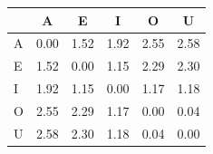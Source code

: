 \begin{tabular}{lccccc}
\toprule
\rowcolor{col01}
 & A & E & I & O & U \\
\midrule
A & 0.00 & 1.52 & 1.92 & 2.55 & 2.58 \\
E & 1.52 & 0.00 & 1.15 & 2.29 & 2.30 \\
I & 1.92 & 1.15 & 0.00 & 1.17 & 1.18 \\
O & 2.55 & 2.29 & 1.17 & 0.00 & 0.04 \\
U & 2.58 & 2.30 & 1.18 & 0.04 & 0.00 \\
\bottomrule
\end{tabular}
